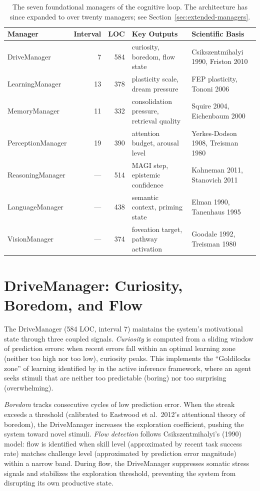 \documentclass[12pt]{book}
\begin{document}
\begin{table}[htbp]
\centering
\caption{The seven foundational managers of the cognitive loop. The architecture has since expanded to over twenty managers; see Section~\ref{sec:extended-managers}.}
\label{tab:core-managers}
\begin{tabular}{lrrlp{4.5cm}}
\toprule
\textbf{Manager} & \textbf{Interval} & \textbf{LOC} & \textbf{Key Outputs} & \textbf{Scientific Basis} \\
\midrule
DriveManager       & 7  & 584 & curiosity, boredom, flow state & Csikszentmihalyi 1990, Friston 2010 \\
LearningManager    & 13 & 378 & plasticity scale, dream pressure & FEP plasticity, Tononi 2006 \\
MemoryManager      & 11 & 332 & consolidation pressure, retrieval quality & Squire 2004, Eichenbaum 2000 \\
PerceptionManager  & 19 & 390 & attention budget, arousal level & Yerkes-Dodson 1908, Treisman 1980 \\
ReasoningManager   & --- & 514 & MAGI step, epistemic confidence & Kahneman 2011, Stanovich 2011 \\
LanguageManager    & --- & 438 & semantic context, priming state & Elman 1990, Tanenhaus 1995 \\
VisionManager      & --- & 374 & foveation target, pathway activation & Goodale 1992, Treisman 1980 \\
\bottomrule
\end{tabular}
\end{table}

\section{DriveManager: Curiosity, Boredom, and Flow}

The DriveManager (584 LOC, interval 7) maintains the system's motivational state through three coupled signals. \textit{Curiosity} is computed from a sliding window of prediction errors: when recent errors fall within an optimal learning zone (neither too high nor too low), curiosity peaks. This implements the ``Goldilocks zone'' of learning identified by \citet{friston2010free} in the active inference framework, where an agent seeks stimuli that are neither too predictable (boring) nor too surprising (overwhelming).

\textit{Boredom} tracks consecutive cycles of low prediction error. When the streak exceeds a threshold (calibrated to Eastwood et al.\ 2012's attentional theory of boredom), the DriveManager increases the exploration coefficient, pushing the system toward novel stimuli. \textit{Flow detection} follows Csikszentmihalyi's (1990) model: flow is identified when skill level (approximated by recent task success rate) matches challenge level (approximated by prediction error magnitude) within a narrow band. During flow, the DriveManager suppresses somatic stress signals and stabilizes the exploration threshold, preventing the system from disrupting its own productive state.
\end{document}
